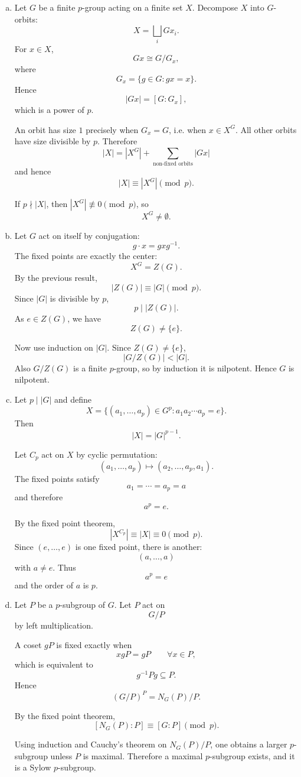 \documentclass[12pt]{article}
\begin{document}
\begin{enumerate}[(a)]

\item Let $G$ be a finite $p$-group acting on a finite set $X$.
Decompose $X$ into $G$-orbits:
\[
X=\bigsqcup_i Gx_i .
\]
For $x\in X$,
\[
Gx\cong G/G_x,
\]
where
\[
G_x=\{g\in G:gx=x\}.
\]
Hence
\[
|Gx|=[G:G_x],
\]
which is a power of $p$.

An orbit has size $1$ precisely when $G_x=G$, i.e. when $x\in X^G$.
All other orbits have size divisible by $p$. Therefore
\[
|X|=|X^G|+\sum_{\text{non-fixed orbits}}|Gx|
\]
and hence
\[
|X|\equiv |X^G|\pmod p.
\]

If $p\nmid |X|$, then $|X^G|\not\equiv0\pmod p$, so
\[
X^G\neq\emptyset .
\]

\item Let $G$ act on itself by conjugation:
\[
g\cdot x=gxg^{-1}.
\]
The fixed points are exactly the center:
\[
X^G=Z(G).
\]
By the previous result,
\[
|Z(G)|\equiv |G|\pmod p.
\]
Since $|G|$ is divisible by $p$,
\[
p\mid |Z(G)|.
\]
As $e\in Z(G)$, we have
\[
Z(G)\neq\{e\}.
\]

Now use induction on $|G|$. Since $Z(G)\neq\{e\}$,
\[
|G/Z(G)|<|G|.
\]
Also $G/Z(G)$ is a finite $p$-group, so by induction it is nilpotent.
Hence $G$ is nilpotent.

\item Let $p\mid |G|$ and define
\[
X=\{(a_1,\dots,a_p)\in G^p:
a_1a_2\cdots a_p=e\}.
\]
Then
\[
|X|=|G|^{p-1}.
\]

Let $C_p$ act on $X$ by cyclic permutation:
\[
(a_1,\dots,a_p)\mapsto(a_2,\dots,a_p,a_1).
\]
The fixed points satisfy
\[
a_1=\cdots=a_p=a
\]
and therefore
\[
a^p=e.
\]

By the fixed point theorem,
\[
|X^{C_p}|\equiv |X|\equiv0\pmod p.
\]
Since $(e,\dots,e)$ is one fixed point, there is another:
\[
(a,\dots,a)
\]
with $a\neq e$.
Thus
\[
a^p=e
\]
and the order of $a$ is $p$.

\item Let $P$ be a $p$-subgroup of $G$. Let $P$ act on
\[
G/P
\]
by left multiplication.

A coset $gP$ is fixed exactly when
\[
xgP=gP\qquad\forall x\in P,
\]
which is equivalent to
\[
g^{-1}Pg\subseteq P.
\]
Hence
\[
(G/P)^P=N_G(P)/P.
\]

By the fixed point theorem,
\[
[N_G(P):P]\equiv[G:P]\pmod p.
\]

Using induction and Cauchy's theorem on $N_G(P)/P$, one obtains a larger
$p$-subgroup unless $P$ is maximal. Therefore a maximal $p$-subgroup exists,
and it is a Sylow $p$-subgroup.


\end{enumerate}
\end{document}
